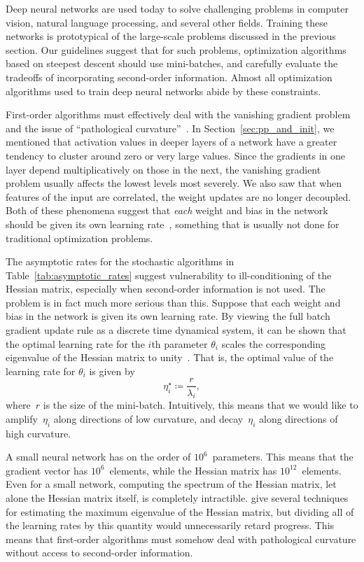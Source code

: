 \documentclass[11pt,a4paper]{article}
\numberwithin{equation}{section}
\begin{document}
Deep neural networks are used today to solve challenging problems in computer
vision, natural language processing, and several other fields. Training these
networks is prototypical of the large-scale problems discussed in the previous
section. Our guidelines suggest that for such problems, optimization algorithms
based on steepest descent should use mini-batches, and carefully evaluate the
tradeoffs of incorporating second-order information. Almost all optimization
algorithms used to train deep neural networks abide by these constraints.

First-order algorithms must effectively deal with the vanishing gradient problem
and the issue of ``pathological curvature''~\citep{martens2010deep}. In
Section~\ref{sec:pp_and_init}, we mentioned that activation values in deeper
layers of a network have a greater tendency to cluster around zero or very large
values. Since the gradients in one layer depend multiplicatively on those in the
next, the vanishing gradient problem usually affects the lowest levels most
severely. We also saw that when features of the input are correlated, the weight
updates are no longer decoupled. Both of these phenomena suggest that
\emph{each} weight and bias in the network should be given its own learning
rate~\citep{lecun-98b}, something that is usually not done for traditional
optimization problems.

The asymptotic rates for the stochastic algorithms in
Table~\ref{tab:asymptotic_rates} suggest vulnerability to ill-conditioning of
the Hessian matrix, especially when second-order information is not used. The
problem is in fact much more serious than this. Suppose that each weight and
bias in the network is given its own learning rate. By viewing the full batch
gradient update rule as a discrete time dynamical system, it can be shown that
the optimal learning rate for the $i$th parameter $\theta_i$ scales the
corresponding eigenvalue of the Hessian matrix to unity~\citep{lecun-98b}. That
is, the optimal value of the learning rate for $\theta_i$ is given by
\[
	\eta_i^\star \coloneqq \frac{r}{\lambda_i},
\]
where~$r$ is the size of the mini-batch. Intuitively, this means that we would
like to amplify~$\eta_i$ along directions of low curvature, and decay~$\eta_i$
along directions of high curvature.

A small neural network has on the order of $10^6$~parameters. This means that
the gradient vector has $10^6$~elements, while the Hessian matrix has
$10^{12}$~elements. Even for a small network, computing the spectrum of the
Hessian matrix, let alone the Hessian matrix itself, is completely intractible.
\citet{lecun-98b} give several techniques for estimating the maximum eigenvalue
of the Hessian matrix, but dividing all of the learning rates by this quantity
would unnecessarily retard progress. This means that first-order algorithms must
somehow deal with pathological curvature without access to second-order
information.
\end{document}

